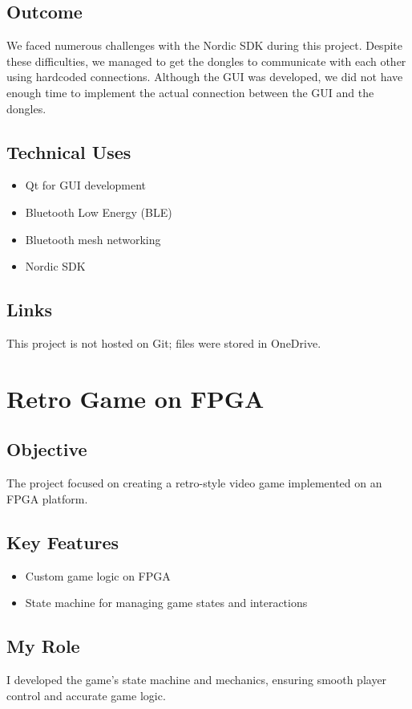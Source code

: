 \documentclass{article}
\begin{document}
\subsection{Outcome}
We faced numerous challenges with the Nordic SDK during this project. Despite these difficulties, we managed to get the dongles to communicate with each other using hardcoded connections. Although the GUI was developed, we did not have enough time to implement the actual connection between the GUI and the dongles.

\subsection{Technical Uses}
\begin{itemize}
    \item Qt for GUI development
    \item Bluetooth Low Energy (BLE)
    \item Bluetooth mesh networking
    \item Nordic SDK
\end{itemize}

\subsection{Links}
This project is not hosted on Git; files were stored in OneDrive.

\section{Retro Game on FPGA}
\subsection{Objective}
The project focused on creating a retro-style video game implemented on an FPGA platform.

\subsection{Key Features}
\begin{itemize}
    \item Custom game logic on FPGA
    \item State machine for managing game states and interactions
\end{itemize}

\subsection{My Role}
I developed the game's state machine and mechanics, ensuring smooth player control and accurate game logic.
\end{document}
